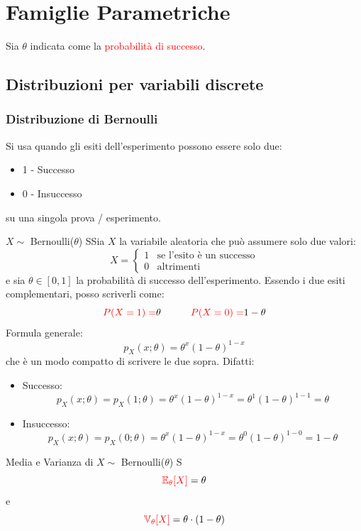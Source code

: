 \documentclass{article}  %
\theoremstyle{definition}
\begin{document}
\section{Famiglie Parametriche}
Sia $\theta$ indicata come la \textcolor{red}{probabilità di successo}.

\subsection{Distribuzioni per variabili discrete}
\subsubsection{Distribuzione di Bernoulli}
Si usa quando gli esiti dell'esperimento possono essere solo due:
\begin{itemize}
	\item 1 - Successo
	\item 0 - Insuccesso
\end{itemize}
su una singola prova / esperimento.
\begin{theorem}{$X \sim$ Bernoulli($\theta$)}
	SSia $X$ la variabile aleatoria che può assumere solo due valori:
	\[
		X =
		\begin{cases}
			1 & \text{se l'esito è un successo} \\
			0 & \text{altrimenti}
		\end{cases}
	\]
	e sia $\theta \in[0,1]$ la probabilità di successo dell'esperimento.
	Essendo i due esiti complementari, posso scriverli come:
	\[
		\textcolor{red}{P(X=1)=}\theta \quad \quad \quad \textcolor{red}{P(X=0)=}1-\theta
	\]
	Formula generale:
	\[
		p_X(x;\theta)=\theta^x(1-\theta)^{1-x}
	\]
	che è un modo compatto di scrivere le due sopra. Difatti:
	\begin{itemize}
		\item Successo:
		      \[
			      p_X(x;\theta)=p_X(1;\theta)=\theta^x(1-\theta)^{1-x}=\theta^1(1-\theta)^{1-1}=\theta
		      \]
		\item Insuccesso:
		      \[
			      p_X(x;\theta)=p_X(0;\theta)=\theta^x(1-\theta)^{1-x}=\theta^0(1-\theta)^{1-0}=1-\theta
		      \]
	\end{itemize}
\end{theorem}
\begin{theorem}{Media e Varianza di $X \sim$ Bernoulli($\theta$)}
	S\[
		\textcolor{red}{\mathbb{E}_{\theta}[X]}=\theta
	\]
	e
	\[
		\textcolor{red}{\mathbb{V}_{\theta}[X]}=\theta \cdot (1-\theta)
	\]
\end{theorem}
\end{document}
